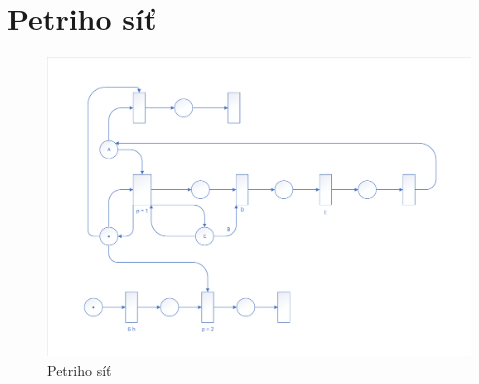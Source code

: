 \documentclass[a4paper, 11pt]{article}
\begin{document}
	\clearpage
	
	\renewcommand{\refname}{Literatura}
	



	\clearpage
	\appendix

	\section{Petriho síť}
	\begin{figure}[!ht]
		\centering
		\vspace{-1.2cm}
		\includegraphics[width=0.95\linewidth]{inc/petri_net.pdf}
		\caption{Petriho síť}
		\label{figure:petri_net}
	\end{figure}
\end{document}
